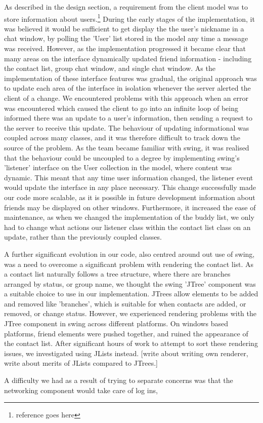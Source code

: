 As described in the design section, a requirement from the client model was to store information about users.\footnote{reference goes here} During the early stages of the implementation, it was believed it would be sufficient to get display the the user's nickname in a chat window, by polling the 'User' list stored in the model any time a message was received. However, as the implementation progressed it became clear that many areas on the interface dynamically updated friend information - including the contact list, group chat window, and single chat window. As the implementation of these interface features was gradual, the original approach was to update each area of the interface in isolation whenever the server alerted the client of a change. We encountered problems with this approach when an error was encountered which caused the client to go into an infinite loop of being informed there was an update to a user's information, then sending a request to the server to receive this update. The behaviour of updating informational was coupled across many classes, and it was therefore difficult to track down the source of the problem. As the team became familiar with swing, it was realised that the behaviour could be uncoupled to a degree by implementing swing's 'listener' interface on the User collection in the model, where content was dynamic. This meant that any time user information changed, the listener event would update the interface in any place necessary. This change successfully made our code more scalable, as it is possible in future development information about friends may be displayed on other windows. Furthermore, it increased the ease of maintenance, as when we changed the implementation of the buddy list, we only had to change what actions our listener class within the contact list class on an update, rather than the previously coupled classes. 

A further significant evolution in our code, also centred around out use of swing, was a need to overcome a significant problem with rendering the contact list. As a contact list naturally follows a tree structure, where there are branches arranged by status, or group name, we thought the swing 'JTree' component was a suitable choice to use in our implementation. JTrees allow elements to be added and removed like 'branches', which is suitable for when contacts are added, or removed, or change status.  However, we experienced rendering problems with the JTree component in swing across different platforms. On windows based platforms, friend elements were pushed together, and ruined the appearance of the contact list.  After significant hours of work to attempt to sort these rendering issues, we investigated using JLists instead. [write about writing own renderer, write about merits of JLists compared to JTrees.]

A difficulty we had as a result of trying to separate concerns was that the networking component would take care of log ins, 